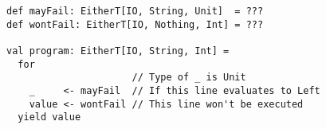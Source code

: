 \begin{algorithm}

\begin{verbatim}
def mayFail: EitherT[IO, String, Unit]  = ???
def wontFail: EitherT[IO, Nothing, Int] = ???

val program: EitherT[IO, String, Int] =
  for
                      // Type of _ is Unit
    _     <- mayFail  // If this line evaluates to Left
    value <- wontFail // This line won't be executed
  yield value
\end{verbatim}

\caption{Usage of EitherT monad transformer with IO monad.%
\label{monadtransformer:either-t-io}}
\end{algorithm}